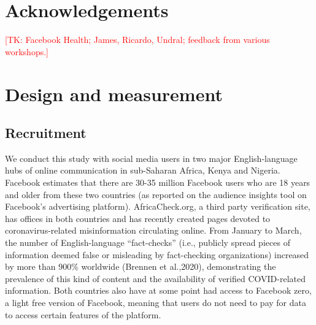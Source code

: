 \documentclass[letterpaper, 12pt, parskip=full,DIV=10]{scrartcl}
\begin{document}
\section{Acknowledgements}
\textcolor{red}{[TK: Facebook Health; James, Ricardo, Undral; feedback from various workshops.]}




\clearpage




\appendix
{}\label{SI}
\renewcommand\thefigure{S\arabic{figure}} 
\renewcommand\thetable{S\arabic{table}} 
 \renewcommand{\thesection}{S\arabic{section}}
\renewcommand*{\thepage}{SI.\arabic{page}}
\setcounter{figure}{0} 
\setcounter{table}{0} 
\appendixpage


  \startcontents
  
 \clearpage
  
\section{Design and measurement}

\subsection{Recruitment}
We conduct this study with social media users in two major English-language hubs of online communication in sub-Saharan Africa, Kenya and Nigeria. Facebook  estimates that there  are  30-35  million  Facebook  users  who  are 18 years and older from these two countries (as reported on the audience insights tool on Facebook's advertising platform).  AfricaCheck.org, a third party verification site, has offices in both countries and has recently created pages devoted to coronavirus-related misinformation circulating online. From January to March, the number of English-language ``fact-checks'' (i.e., publicly spread pieces of information deemed false or misleading by fact-checking organizations) increased by more than 900\% worldwide (Brennen et al.,2020), demonstrating the prevalence of this kind of content and the availability of verified COVID-related information. Both countries also have at some point had access to Facebook zero, a light free version of Facebook, meaning that users do not need to pay for data to access certain features of the platform. 
\end{document}
